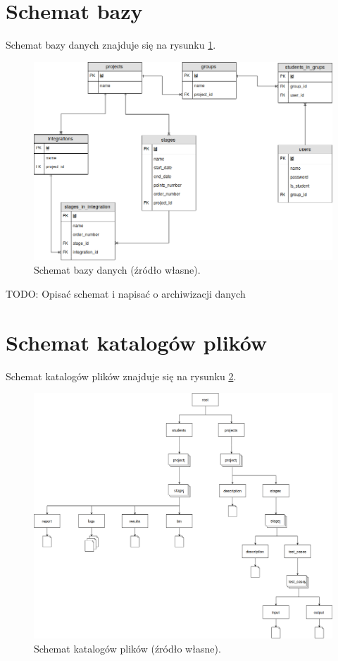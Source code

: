 \section{Schemat bazy}

Schemat bazy danych znajduje się na rysunku \ref{fig:platform-db-schema}.

\begin{figure}[h]
    \centering
    \includegraphics[width = 13cm]{chapter02/db_schema.png}
    \caption{Schemat bazy danych (źródło własne).}
    \label{fig:platform-db-schema}
\end{figure}

TODO: Opisać schemat i napisać o archiwizacji danych

\section{Schemat katalogów plików}

Schemat katalogów plików znajduje się na rysunku \ref{fig:platform-directories}.

\begin{figure}[h]
    \centering
    \includegraphics[width = 13cm]{chapter02/directories.png}
    \caption{Schemat katalogów plików (źródło własne).}
    \label{fig:platform-directories}
\end{figure}

